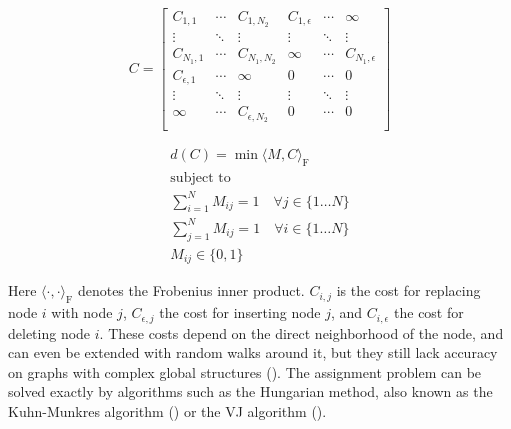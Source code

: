 \vspace{.2cm}

\noindent
\begin{minipage}{.5\linewidth}

     \[
          C=
               \left[
               \begin{array}{ccc|ccc}
                    C_{1,1} & \dotsi & C_{1, N_2} & C_{1, \epsilon} & \dotsi & \infty \\
                    \vdots & \ddots & \vdots & \vdots & \ddots & \vdots \\
                    C_{N_1, 1} & \dotsi & C_{N_1, N_2} & \infty & \dotsi & C_{N_1, \epsilon} \\
                    \hline
                    C_{\epsilon, 1} & \dotsi & \infty & 0 & \dotsi & 0 \\
                    \vdots & \ddots & \vdots & \vdots & \ddots & \vdots \\
                    \infty & \dotsi & C_{\epsilon, N_2} & 0 & \dotsi & 0 \\
               \end{array}
               \right]
     \]

\end{minipage}%
\begin{minipage}{.5\linewidth}

     \begin{equation}
          \begin{gathered}
               d(C) = \min \langle M, C \rangle_\mathrm{F} \\
               \text{subject to} \\
               \sum_{i = 1}^{N} M_{ij} = 1 \quad \forall j \in \{1 \dots N\} \\
               \sum_{j = 1}^{N} M_{ij} = 1 \quad \forall i \in \{1 \dots N\} \\
               M_{ij} \in \{0, 1\}
          \end{gathered}
     \end{equation}

\end{minipage}


\vspace{.2cm}

Here $\langle \cdot, \cdot \rangle_\mathrm{F}$ denotes the Frobenius inner product. $C_{i, j}$ is the cost for replacing node $i$ with node $j$, $C_{\epsilon, j}$ the cost for inserting node $j$, and $C_{i, \epsilon}$ the cost for deleting node $i$. These costs depend on the direct neighborhood of the node, and can even be extended with random walks around it, but they still lack accuracy on graphs with complex global structures (\citealp{hungarian2009}). The assignment problem can be solved exactly by algorithms such as the Hungarian method, also known as the Kuhn-Munkres algorithm (\citealp{hungarian1955}) or the VJ algorithm (\citealp{vj1987}).

